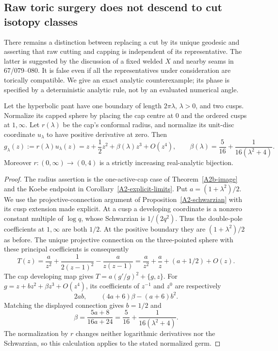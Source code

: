 \subsection{Raw toric surgery does not descend to cut isotopy classes}
\label{sec:A1-toric-descent}

There remains a distinction between replacing a cut by its unique
geodesic and asserting that raw cutting and capping is independent
of its representative. The latter is suggested by the discussion
of a fixed welded $X$ and nearby seams in 67/079--080. It is false
even if all the representatives under consideration are torically
compatible. We give an exact analytic counterexample; its phase
is specified by a deterministic analytic rule, not by an evaluated
numerical angle.

\begin{lemma}
\label{A1-pant-third-jet}
Let the hyperbolic pant have one boundary of length $2\pi\lambda$,
$\lambda>0$, and two cusps. Normalize its capped sphere by placing
the cap centre at $0$ and the ordered cusps at $1,\infty$.
Let $r(\lambda)$ be the cap's conformal radius, and normalize its
unit-disc coordinate $u_\lambda$ to have positive derivative at
zero. Then
\[
 g_\lambda(z):=r(\lambda)u_\lambda(z)
       =z+\frac12z^2+\beta(\lambda)z^3+O(z^4),
 \qquad
 \beta(\lambda)=\frac5{16}
                 +\frac1{16(\lambda^2+4)}.
\]
Moreover $r:(0,\infty)\to(0,4)$ is a strictly increasing
real-analytic bijection.
\end{lemma}
\begin{proof}
The radius assertion is the one-active-cap case of
Theorem~\ref{A2b-image} and the Koebe endpoint in
Corollary~\ref{A2-explicit-limits}. Put
$a=(1+\lambda^2)/2$. We use the projective-connection argument
of Proposition~\ref{A2-schwarzian} with its cusp extension made
explicit. At a cusp a developing coordinate is a nonzero constant
multiple of $\log q$, whose Schwarzian is $1/(2q^2)$.
Thus the double-pole coefficients at $1,\infty$ are both $1/2$.
At the positive boundary they are $(1+\lambda^2)/2$ as before.
The unique projective connection on the three-pointed sphere with
these principal coefficients is consequently
\[
 T(z)=\frac a{z^2}+\frac1{2(z-1)^2}
                         -\frac a{z(z-1)}
      =\frac a{z^2}+\frac a z+(a+1/2)+O(z).
\]
The cap developing map gives
$T=a(g'/g)^2+\{g,z\}$. For
$g=z+bz^2+\beta z^3+O(z^4)$, its coefficients of $z^{-1}$ and
$z^0$ are respectively
\[
 2ab,\qquad (4a+6)\beta-(a+6)b^2.
\]
Matching the displayed connection gives $b=1/2$ and
\[
 \beta=\frac{5a+8}{16a+24}
       =\frac5{16}+\frac1{16(\lambda^2+4)}.
\]
The normalization by $r$ changes neither logarithmic derivatives
nor the Schwarzian, so this calculation applies to the stated
normalized germ.
\end{proof}

